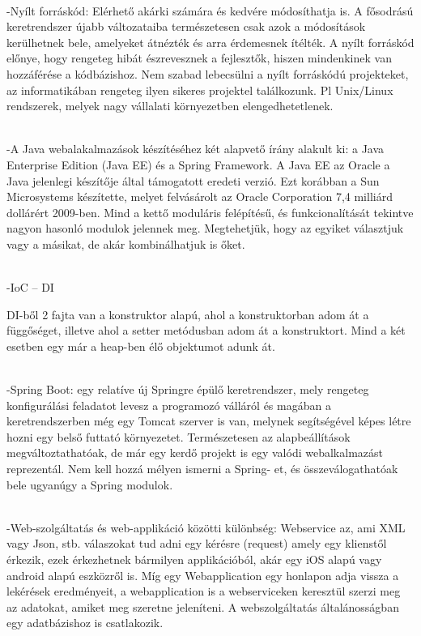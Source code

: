 \documentclass[11pt]{article}
\begin{document}
\\ -Nyílt forráskód: Elérhető akárki számára és kedvére módosíthatja is. A fősodrású keretrendszer újabb változataiba természetesen csak azok a módosítások kerülhetnek bele, amelyeket átnézték és arra érdemesnek ítélték. A nyílt forráskód előnye, hogy rengeteg hibát észrevesznek a fejlesztők, hiszen mindenkinek van hozzáférése a kódbázishoz. Nem szabad lebecsülni a nyílt forráskódú projekteket, az informatikában rengeteg ilyen sikeres projektel találkozunk. Pl Unix/Linux rendszerek, melyek nagy vállalati környezetben elengedhetetlenek.

\\ -A Java webalakalmazások készítéséhez két alapvető írány alakult ki: a Java Enterprise Edition (Java EE) és a Spring Framework. A Java EE az Oracle a Java jelenlegi készítője által támogatott eredeti verzió. Ezt korábban a Sun Microsystems készítette, melyet felvásárolt az Oracle Corporation 7,4 milliárd dollárért 2009-ben. Mind a kettő moduláris felépítésű, és funkcionalítását tekintve nagyon hasonló modulok jelennek meg. Megtehetjük, hogy az egyiket választjuk vagy a másikat, de akár kombinálhatjuk is őket.

\\ -IoC – DI

DI-ből 2 fajta van a konstruktor alapú, ahol a konstruktorban adom át a függőséget, illetve ahol a setter metódusban adom át a konstruktort. Mind a két esetben egy már a heap-ben élő objektumot adunk át.

\\ -Spring Boot: egy relatíve új Springre épülő keretrendszer, mely rengeteg konfigurálási feladatot levesz a programozó válláról és magában a keretrendszerben még egy Tomcat szerver is van, melynek segítségével képes létre hozni egy belső futtató környezetet. Természetesen az alapbeállítások megváltoztathatóak, de már egy kerdő projekt is egy valódi webalkalmazást reprezentál. Nem kell hozzá mélyen ismerni a Spring-
et, és összeválogathatóak bele ugyanúgy a Spring modulok. 

\\ -Web-szolgáltatás és web-applikáció közötti különbség: Webservice az, ami XML vagy Json, stb. válaszokat tud adni egy kérésre (request) amely egy klienstől érkezik, ezek érkezhetnek bármilyen applikációból, akár egy iOS alapú vagy android alapú eszközről is. Míg egy Webapplication egy honlapon adja vissza a lekérések eredményeit, a webapplication is a webserviceken keresztül szerzi meg az adatokat, amiket meg szeretne jeleníteni. A webszolgáltatás általánosságban egy adatbázishoz is csatlakozik.
\end{document}
